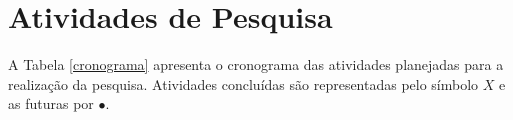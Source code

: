 \documentclass[msc, classic, a4paper]{ufbathesis}
\begin{document}
\section{Atividades de Pesquisa}

A Tabela \ref{cronograma} apresenta o cronograma das atividades planejadas para a realização da pesquisa. Atividades concluídas são representadas pelo símbolo $X$ e as futuras por $\bullet$.

\begin{table}[htbp]
\begin{center}
\caption{Cronograma de atividades}     %
\label{cronograma} %
\end{center}
\end{table}
\end{document}
